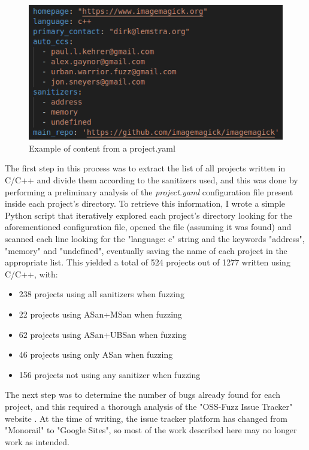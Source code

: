 \begin{figure}[h]
\centering
\includegraphics[scale=0.5]{foto/project_yaml.png}
\caption{Example of content from a project.yaml}
\label{fig:project_yaml}
\end{figure}

The first step in this process was to extract the list of all projects written in C/C++ and divide them according to the sanitizers used, and this was done by performing a preliminary analysis of the \textit{project.yaml} configuration file present inside each project's directory. To retrieve this information, I wrote a simple Python script that iteratively explored each project's directory looking for the aforementioned configuration file, opened the file (assuming it was found) and scanned each line looking for the "language: c" string and the keywords "address", "memory" and "undefined", eventually saving the name of each project in the appropriate list.
\newline \newline
This yielded a total of 524 projects out of 1277 written using C/C++, with: 
\begin{itemize}
    \item 238 projects using all sanitizers when fuzzing
    \item 22 projects using ASan+MSan when fuzzing
    \item 62 projects using ASan+UBSan when fuzzing
    \item 46 projects using only ASan when fuzzing
    \item 156 projects not using any sanitizer when fuzzing
\end{itemize}

The next step was to determine the number of bugs already found for each project, and this required a thorough analysis of the "OSS-Fuzz Issue Tracker" website \cite{ossfuzz_bugtracker}. At the time of writing, the issue tracker platform has changed from "Monorail" to "Google Sites", so most of the work described here may no longer work as intended.

